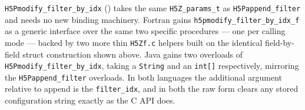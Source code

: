 \documentclass[../RFC-HDFG-2026-001.tex]{subfiles}
\begin{document}
\texttt{H5Pmodify\_filter\_by\_idx} () takes
the same \texttt{H5Z\_params\_t} as \texttt{H5Pappend\_filter} and needs no
new binding machinery.  Fortran gains
\texttt{h5pmodify\_filter\_by\_idx\_f} as a generic interface over the same
two specific procedures --- one per calling mode --- backed by two more
thin \texttt{H5Zf.c} helpers built on the identical field-by-field struct
construction shown above.  Java gains two overloads of
\texttt{H5Pmodify\_filter\_by\_idx}, taking a \texttt{String} and an
\texttt{int[]} respectively, mirroring the \texttt{H5Pappend\_filter}
overloads.  In both languages the additional argument relative to append is
the \texttt{filter\_idx}, and in both the raw form clears any stored
configuration string exactly as the C API does.
\end{document}
